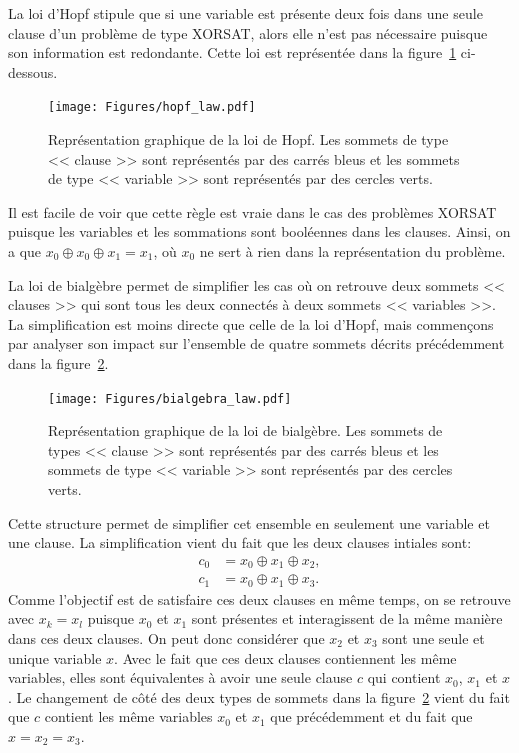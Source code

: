 La loi d'Hopf stipule que si une variable est présente deux fois dans une seule clause d'un problème de type XORSAT, alors elle n'est pas nécessaire puisque son information est redondante.
Cette loi est représentée dans la figure~\ref{fig:hopf-law} ci-dessous.
\begin{figure}[h]
    \centering
    \texttt{[image: Figures/hopf\_law.pdf]}
    \caption[Représentation graphique de la loi de Hopf.]{Représentation graphique de la loi de Hopf. Les sommets de type << clause >> sont représentés par des carrés bleus et les sommets de type << variable >> sont représentés par des cercles verts.}
    \label{fig:hopf-law}
\end{figure}
Il est facile de voir que cette règle est vraie dans le cas des problèmes XORSAT puisque les variables et les sommations sont booléennes dans les clauses.
Ainsi, on a que $x_0 \oplus x_0 \oplus x_1 = x_1$, où $x_0$ ne sert à rien dans la représentation du problème.

La loi de bialgèbre permet de simplifier les cas où on retrouve deux sommets << clauses >> qui sont tous les deux connectés à deux sommets << variables >>.
La simplification est moins directe que celle de la loi d'Hopf, mais commençons par analyser son impact sur l'ensemble de quatre sommets décrits précédemment dans la figure~\ref{fig:bialgebra-law}.
\begin{figure}[h]
    \centering
    \texttt{[image: Figures/bialgebra\_law.pdf]}
    \caption[Représentation graphique de la loi de bialgèbre.]{Représentation graphique de la loi de bialgèbre. Les sommets de types << clause >> sont représentés par des carrés bleus et les sommets de type << variable >> sont représentés par des cercles verts.}
    \label{fig:bialgebra-law}
\end{figure}
Cette structure permet de simplifier cet ensemble en seulement une variable et une clause.
La simplification vient du fait que les deux clauses intiales sont:
\begin{equation}
    \begin{split}
        c_0 &= x_0 \oplus x_1 \oplus x_2,\\
        c_1 &= x_0 \oplus x_1 \oplus x_3.
    \end{split}
\end{equation}
Comme l'objectif est de satisfaire ces deux clauses en même temps, on se retrouve avec $x_k  = x_l$ puisque $x_0$ et $x_1$ sont présentes et interagissent de la même manière dans ces deux clauses.
On peut donc considérer que $x_2$ et $x_3$ sont une seule et unique variable $x$.
Avec le fait que ces deux clauses contiennent les même variables, elles sont équivalentes à avoir une seule clause $c$ qui contient $x_0$, $x_1$ et $x$.
Le changement de côté des deux types de sommets dans la figure~\ref{fig:bialgebra-law} vient du fait que $c$ contient les même variables $x_0$ et $x_1$ que précédemment et du fait que $x = x_2 = x_3$.

